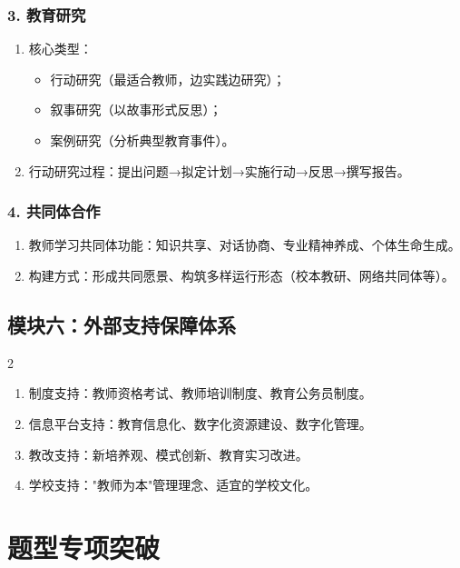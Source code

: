 \documentclass[12pt,a4paper]{article}
\begin{document}
\subsubsection{3. 教育研究}
\begin{enumerate}[label=1.,itemsep=0.3ex]
\item 核心类型：
    \begin{itemize}
        \item 行动研究（最适合教师，边实践边研究）；
        \item 叙事研究（以故事形式反思）；
        \item 案例研究（分析典型教育事件）。
    \end{itemize}
\item 行动研究过程：提出问题→拟定计划→实施行动→反思→撰写报告。
\end{enumerate}

\subsubsection{4. 共同体合作}
\begin{enumerate}[label=•,itemsep=0.5ex]
\item 教师学习共同体功能：知识共享、对话协商、专业精神养成、个体生命生成。
\item 构建方式：形成共同愿景、构筑多样运行形态（校本教研、网络共同体等）。
\end{enumerate}

\subsection{模块六：外部支持保障体系}
\begin{multicols}{2}
\begin{enumerate}[label=•,itemsep=0.5ex]
\item 制度支持：教师资格考试、教师培训制度、教育公务员制度。
\item 信息平台支持：教育信息化、数字化资源建设、数字化管理。
\item 教改支持：新培养观、模式创新、教育实习改进。
\item 学校支持："教师为本"管理理念、适宜的学校文化。
\end{enumerate}
\end{multicols}

\section{题型专项突破}
\end{document}
